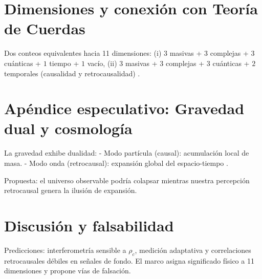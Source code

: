 \documentclass[reprint,amsmath,amssymb,aps]{revtex4-2}
\begin{document}
\section{Dimensiones y conexión con Teoría de Cuerdas}
Dos conteos equivalentes hacia 11 dimensiones:  
(i) $3$ masivas + $3$ complejas + $3$ cuánticas + $1$ tiempo + $1$ vacío,  
(ii) $3$ masivas + $3$ complejas + $3$ cuánticas + $2$ temporales (causalidad y retrocausalidad) \cite{Greene2000, Penrose2004}.

\section{Apéndice especulativo: Gravedad dual y cosmología}
La gravedad exhibe dualidad:  
- Modo partícula (causal): acumulación local de masa.  
- Modo onda (retrocausal): expansión global del espacio-tiempo \cite{Carroll2010}.  

Propuesta: el universo observable podría colapsar mientras nuestra percepción retrocausal genera la ilusión de expansión.

\section{Discusión y falsabilidad}
Predicciones: interferometría sensible a $\rho_c$, medición adaptativa y correlaciones retrocausales débiles en señales de fondo. El marco asigna significado físico a 11 dimensiones y propone vías de falsación.



\end{document}
